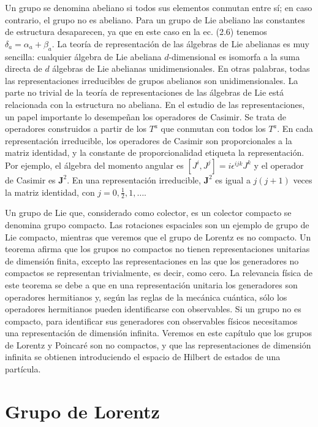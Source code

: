 Un grupo se denomina abeliano si todos sus elementos conmutan entre sí; en caso contrario, el grupo no es abeliano. Para un grupo de Lie abeliano las constantes de estructura desaparecen, ya que en este caso en la ec. (2.6) tenemos $\delta_{a}=\alpha_{a}+\beta_{a}$. La teoría de representación de las álgebras de Lie abelianas es muy sencilla: cualquier álgebra de Lie abeliana $d$-dimensional es isomorfa a la suma directa de $d$ álgebras de Lie abelianas unidimensionales. En otras palabras, todas las representaciones irreducibles de grupos abelianos son unidimensionales. La parte no trivial de la teoría de representaciones de las álgebras de Lie está relacionada con la estructura no abeliana. En el estudio de las representaciones, un papel importante lo desempeñan los operadores de Casimir. Se trata de operadores construidos a partir de los $T^{a}$ que conmutan con todos los $T^{a}$. En cada representación irreducible, los operadores de Casimir son proporcionales a la matriz identidad, y la constante de proporcionalidad etiqueta la representación. Por ejemplo, el álgebra del momento angular es $\left[J^{i}, J^{j}\right]=i \epsilon^{i j k} J^{k}$ y el operador de Casimir es $\mathbf{J}^{2}$. En una representación irreducible, $\mathbf{J}^{2}$ es igual a $j(j+1)$ veces la matriz identidad, con $j=0, \frac{1}{2}, 1, \ldots$.

Un grupo de Lie que, considerado como colector, es un colector compacto se denomina grupo compacto. Las rotaciones espaciales son un ejemplo de grupo de Lie compacto, mientras que veremos que el grupo de Lorentz es no compacto. Un teorema afirma que los grupos no compactos no tienen representaciones unitarias de dimensión finita, excepto las representaciones en las que los generadores no compactos se representan trivialmente, es decir, como cero. La relevancia física de este teorema se debe a que en una representación unitaria los generadores son operadores hermitianos y, según las reglas de la mecánica cuántica, sólo los operadores hermitianos pueden identificarse con observables. Si un grupo no es compacto, para identificar sus generadores con observables físicos necesitamos una representación de dimensión infinita. Veremos en este capítulo que los grupos de Lorentz y Poincaré son no compactos, y que las representaciones de dimensión infinita se obtienen introduciendo el espacio de Hilbert de estados de una partícula.

  \section{Grupo de Lorentz}

